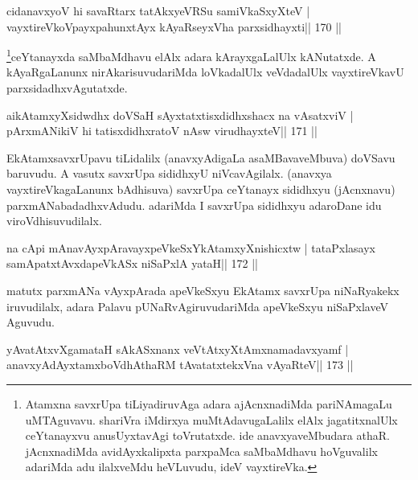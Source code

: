 
\begin{shl}
cidanavxyoV hi savaRtarx tatAkxyeVRSu samiVkaSxyXteV |
vayxtireVkoV\s payxpahunxtAyx kAyaRseyxVha parxsidhayxti\hfill || 170 ||
\end{shl}

\begin{artha}
\footnote{Atamxna savxrUpa tiLiyadiruvAga adara ajAcnxnadiMda 
pariNAmagaLu uMTAguvavu. shariVra iMdirxya muMtAdavugaLalilx elAlx 
jagatitxnalUlx ceYtanayxvu anusUyxtavAgi toVrutatxde. ide 
anavxyaveMbudara athaR. jAcnxnadiMda avidAyxkalipxta parxpaMca 
saMbaMdhavu hoVguvalilx adariMda adu ilalxveMdu heVLuvudu, ideV vayxtireVka.}ceYtanayxda saMbaMdhavu elAlx adara kArayxgaLalUlx kANutatxde. A kAyaRgaLanunx nirAkarisuvudariMda loVkadalUlx veVdadalUlx vayxtireVkavU parxsidadhxvAgutatxde.
\end{artha}


\begin{shl}
aikAtamxyXsidwdhx doVSaH sAyxtatxtisxdidhxshacx na vAsatxviV |
pArxmANikiV hi tatisxdidhxratoV nAsw virudhayxteV\hfill || 171 ||
\end{shl}

\begin{artha}
EkAtamxsavxrUpavu tiLidalilx (anavxyAdigaLa asaMBavaveMbuva) doVSavu 
baruvudu. A vasutx savxrUpa sididhxyU niVcavAgilalx. (anavxya 
vayxtireVkagaLanunx bAdhisuva) savxrUpa ceYtanayx sididhxyu (jAcnxnavu) parxmANabadadhxvAdudu. adariMda I savxrUpa sididhxyu adaroDane idu viroVdhisuvudilalx.
\end{artha}

\begin{shl}
na cApi mAnavAyxpAravayxpeVkeSxYkAtamxyXnishicxtw |
tataPxlasayx samApatxtAvxdapeVkASx niSaPxlA yataH\hfill || 172 ||
\end{shl}

\begin{artha}
matutx parxmANa vAyxpArada apeVkeSxyu EkAtamx savxrUpa niNaRyakekx iruvudilalx, adara Palavu pUNaRvAgiruvudariMda apeVkeSxyu niSaPxlaveV Aguvudu.
\end{artha}

\begin{shl}
yAvatAtxvXgamataH sAkASxnanx veVtAtxyXtAmxnamadavxyamf |
anavxyAdAyxtamxboVdhAthaRM tAvatatxtekxVna vAyaRteV\hfill || 173 ||
\end{shl}

